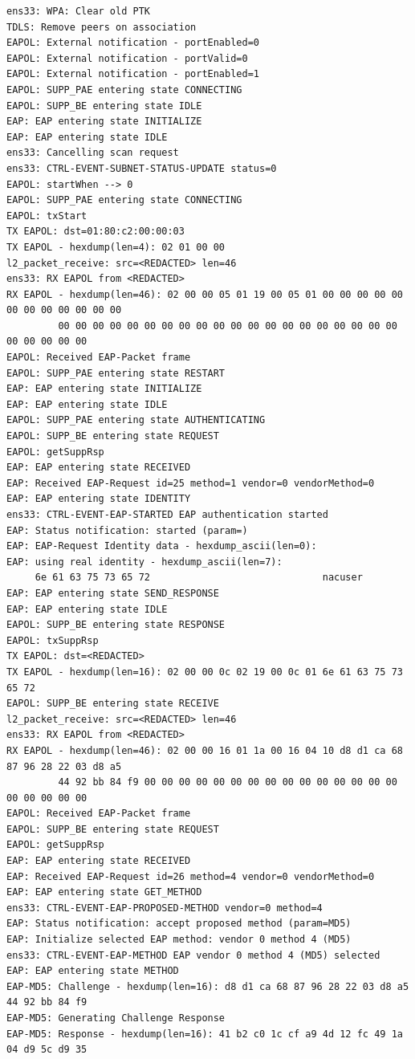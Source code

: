 \documentclass[11pt]{article}
\begin{document}
\begin{verbatim}
ens33: WPA: Clear old PTK
TDLS: Remove peers on association
EAPOL: External notification - portEnabled=0
EAPOL: External notification - portValid=0
EAPOL: External notification - portEnabled=1
EAPOL: SUPP_PAE entering state CONNECTING
EAPOL: SUPP_BE entering state IDLE
EAP: EAP entering state INITIALIZE
EAP: EAP entering state IDLE
ens33: Cancelling scan request
ens33: CTRL-EVENT-SUBNET-STATUS-UPDATE status=0
EAPOL: startWhen --> 0
EAPOL: SUPP_PAE entering state CONNECTING
EAPOL: txStart
TX EAPOL: dst=01:80:c2:00:00:03
TX EAPOL - hexdump(len=4): 02 01 00 00
l2_packet_receive: src=<REDACTED> len=46
ens33: RX EAPOL from <REDACTED>
RX EAPOL - hexdump(len=46): 02 00 00 05 01 19 00 05 01 00 00 00 00 00 00 00 00 00 00 00 00
         00 00 00 00 00 00 00 00 00 00 00 00 00 00 00 00 00 00 00 00 00 00 00 00 00
EAPOL: Received EAP-Packet frame
EAPOL: SUPP_PAE entering state RESTART
EAP: EAP entering state INITIALIZE
EAP: EAP entering state IDLE
EAPOL: SUPP_PAE entering state AUTHENTICATING
EAPOL: SUPP_BE entering state REQUEST
EAPOL: getSuppRsp
EAP: EAP entering state RECEIVED
EAP: Received EAP-Request id=25 method=1 vendor=0 vendorMethod=0
EAP: EAP entering state IDENTITY
ens33: CTRL-EVENT-EAP-STARTED EAP authentication started
EAP: Status notification: started (param=)
EAP: EAP-Request Identity data - hexdump_ascii(len=0):
EAP: using real identity - hexdump_ascii(len=7):
     6e 61 63 75 73 65 72                              nacuser         
EAP: EAP entering state SEND_RESPONSE
EAP: EAP entering state IDLE
EAPOL: SUPP_BE entering state RESPONSE
EAPOL: txSuppRsp
TX EAPOL: dst=<REDACTED>
TX EAPOL - hexdump(len=16): 02 00 00 0c 02 19 00 0c 01 6e 61 63 75 73 65 72
EAPOL: SUPP_BE entering state RECEIVE
l2_packet_receive: src=<REDACTED> len=46
ens33: RX EAPOL from <REDACTED>
RX EAPOL - hexdump(len=46): 02 00 00 16 01 1a 00 16 04 10 d8 d1 ca 68 87 96 28 22 03 d8 a5
         44 92 bb 84 f9 00 00 00 00 00 00 00 00 00 00 00 00 00 00 00 00 00 00 00 00
EAPOL: Received EAP-Packet frame
EAPOL: SUPP_BE entering state REQUEST
EAPOL: getSuppRsp
EAP: EAP entering state RECEIVED
EAP: Received EAP-Request id=26 method=4 vendor=0 vendorMethod=0
EAP: EAP entering state GET_METHOD
ens33: CTRL-EVENT-EAP-PROPOSED-METHOD vendor=0 method=4
EAP: Status notification: accept proposed method (param=MD5)
EAP: Initialize selected EAP method: vendor 0 method 4 (MD5)
ens33: CTRL-EVENT-EAP-METHOD EAP vendor 0 method 4 (MD5) selected
EAP: EAP entering state METHOD
EAP-MD5: Challenge - hexdump(len=16): d8 d1 ca 68 87 96 28 22 03 d8 a5 44 92 bb 84 f9
EAP-MD5: Generating Challenge Response
EAP-MD5: Response - hexdump(len=16): 41 b2 c0 1c cf a9 4d 12 fc 49 1a 04 d9 5c d9 35

\end{verbatim}
\end{document}

